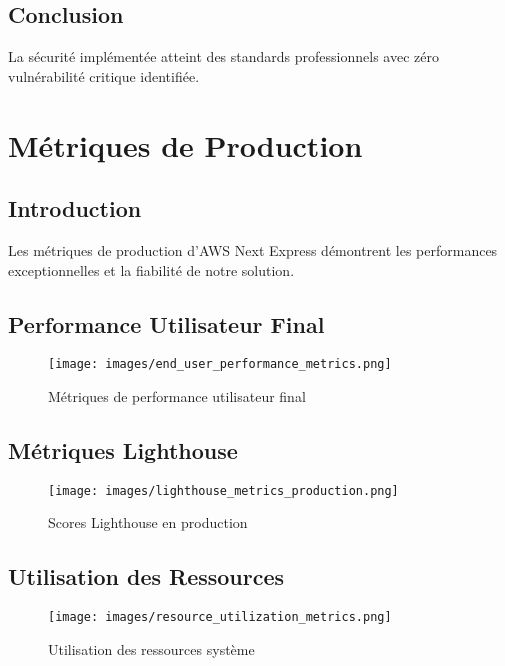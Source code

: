 \begin{table}[H]
\begin{table}[H]
\begin{table}[H]
\begin{table}[H]
\subsection{Conclusion}

La sécurité implémentée atteint des standards professionnels avec zéro vulnérabilité critique identifiée.

\section{Métriques de Production}

\subsection{Introduction}

Les métriques de production d'AWS Next Express démontrent les performances exceptionnelles et la fiabilité de notre solution.

\subsection{Performance Utilisateur Final}

\begin{figure}[H]
    \centering
    \texttt{[image: images/end\_user\_performance\_metrics.png]}
    \caption{Métriques de performance utilisateur final}
    \label{fig:end_user_performance}
\end{figure}

\subsection{Métriques Lighthouse}

\begin{figure}[H]
    \centering
    \texttt{[image: images/lighthouse\_metrics\_production.png]}
    \caption{Scores Lighthouse en production}
    \label{fig:lighthouse_production}
\end{figure}

\subsection{Utilisation des Ressources}

\begin{figure}[H]
    \centering
    \texttt{[image: images/resource\_utilization\_metrics.png]}
    \caption{Utilisation des ressources système}
    \label{fig:resource_utilization}
\end{figure}


\end{table}
\end{table}
\end{table}
\end{table}
